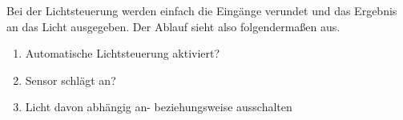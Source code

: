 Bei der Lichtsteuerung werden einfach die Eingänge verundet und das Ergebnis an das Licht ausgegeben. Der Ablauf sieht also folgendermaßen aus.
\begin{enumerate}
\item{Automatische Lichtsteuerung aktiviert?}
\item{Sensor schlägt an?}
\item{Licht davon abhängig an- beziehungsweise ausschalten}
\end{enumerate}